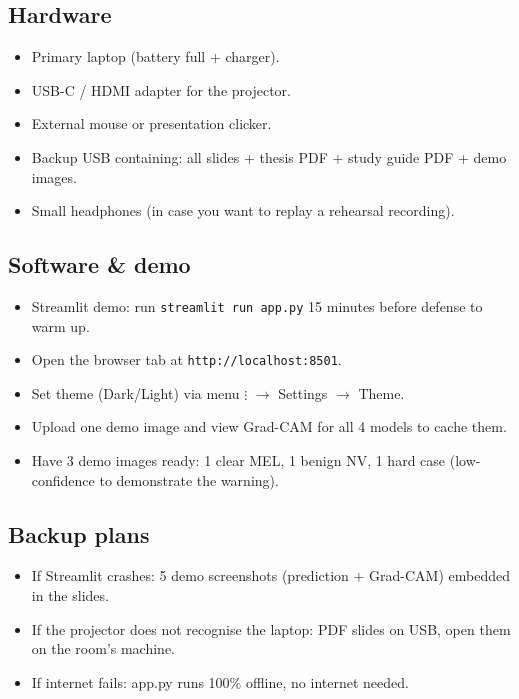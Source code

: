 \documentclass[11pt,a4paper]{article}
\begin{document}
\subsection{Hardware}
\begin{itemize}[leftmargin=*, itemsep=2pt]
  \item Primary laptop (battery full + charger).
  \item USB-C / HDMI adapter for the projector.
  \item External mouse or presentation clicker.
  \item Backup USB containing: all slides + thesis PDF + study guide PDF + demo images.
  \item Small headphones (in case you want to replay a rehearsal recording).
\end{itemize}

\subsection{Software \& demo}
\begin{itemize}[leftmargin=*, itemsep=2pt]
  \item Streamlit demo: run \texttt{streamlit run app.py} 15 minutes before defense to warm up.
  \item Open the browser tab at \texttt{http://localhost:8501}.
  \item Set theme (Dark/Light) via menu $\vdots$ $\to$ Settings $\to$ Theme.
  \item Upload one demo image and view Grad-CAM for all 4 models to cache them.
  \item Have 3 demo images ready: 1 clear MEL, 1 benign NV, 1 hard case (low-confidence to demonstrate the warning).
\end{itemize}

\subsection{Backup plans}
\begin{itemize}[leftmargin=*, itemsep=2pt]
  \item If Streamlit crashes: 5 demo screenshots (prediction + Grad-CAM) embedded in the slides.
  \item If the projector does not recognise the laptop: PDF slides on USB, open them on the room's machine.
  \item If internet fails: app.py runs 100\% offline, no internet needed.
\end{itemize}
\end{document}
